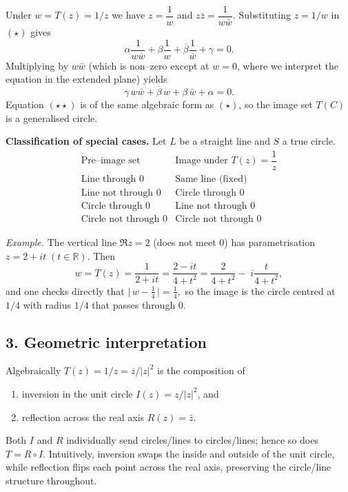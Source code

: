 \documentclass[12pt]{article}
\theoremstyle{definition} %
\theoremstyle{plain} %
\begin{document}
  Under \(w=T(z)=1/z\) we have \(z=\dfrac{1}{w}\) and
  \(z\bar z=\dfrac{1}{w\bar w}\).
  Substituting \(z=1/w\) in \((\star)\) gives
  \[
     \alpha\frac{1}{w\bar w}
     +\beta\frac{1}{w}
     +\overline{\beta}\frac{1}{\bar w}
     +\gamma =0.
  \]
  Multiplying by \(w\bar w\) (which is non–zero except at \(w=0\), where
  we interpret the equation in the extended plane) yields
  \[
     \gamma\,w\bar w
     +\overline{\beta}\,w
     +\beta\,\bar w
     +\alpha =0.
     \tag{$\star\star$}
  \]
  Equation \((\star\star)\) is of the same algebraic form as
  \((\star)\), so the image set \(T(C)\) is a generalised circle.
  
  \medskip
  \noindent
  \textbf{Classification of special cases.}
  Let \(L\) be a straight line and \(S\) a true circle.
  \[
  \begin{array}{c|c}
  \text{Pre–image set}  & \text{Image under }T(z)=\dfrac{1}{z} \\ \hline
  \text{Line through }0 & \text{Same line (fixed)} \\[3pt]
  \text{Line not through }0 & \text{Circle through }0 \\[6pt]
  \text{Circle through }0 & \text{Line not through }0 \\[6pt]
  \text{Circle not through }0 & \text{Circle not through }0
  \end{array}
  \]
  
  \smallskip
  \emph{Example.}
  The vertical line \(\Re z=2\) (does not meet \(0\)) has parametrisation
  \(z=2+it\;(t\in\mathbb R)\).  Then
  \[
     w=T(z)=\frac{1}{2+it}
       =\frac{2-it}{4+t^{2}}
       =\frac{2}{4+t^{2}}-\;i\frac{t}{4+t^{2}},
  \]
  and one checks directly that
  \(
     \bigl|\,w-\tfrac14\,\bigr|=\tfrac14,
  \)
  so the image is the circle centred at \(1/4\) with radius \(1/4\) that
  passes through \(0\).
  
  \subsection*{3. Geometric interpretation}
  Algebraically
  \(
     T(z)=1/z
     =\overline z/|z|^{2}
  \)
  is the composition of
  \begin{enumerate}
  \item inversion in the unit circle \(I(z)=z/|z|^{2}\), and
  \item reflection across the real axis \(R(z)=\bar z\).
  \end{enumerate}
  Both \(I\) and \(R\) individually send circles/lines to
  circles/lines; hence so does \(T=R\circ I\).
  Intuitively, inversion swaps the inside and outside of the unit circle,
  while reflection flips each point across the real axis, preserving the
  circle/line structure throughout.
  
\end{document}
